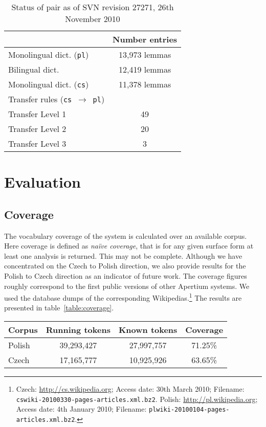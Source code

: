 \documentclass[11pt]{article}
\begin{document}
\begin{table}
\centering
\begin{tabular}{|l|c|}
\hline
                                           & Number entries\\
\hline
Monolingual dict. ({\tt pl})               & 13,973 lemmas \\
Bilingual dict.                            & 12,419 lemmas \\
Monolingual dict. ({\tt cs})               & 11,378 lemmas \\
\hline
Transfer rules ({\tt cs $\rightarrow$ pl}) &  \\
\hline
Transfer Level 1                                    & 49 \\
Transfer Level 2                                    & 20 \\
Transfer Level 3                                    & 3 \\
\hline
\end{tabular}
    \caption{Status of pair as of SVN revision 27271, 26th November 2010}
    \label{table:status}
\end{table}

\section{Evaluation}
\subsection{Coverage}

The vocabulary coverage of the system is calculated over an available corpus. Here coverage
is defined as \emph{na\"ive coverage}, that is for any given surface form at least one analysis
is returned. This may not be complete. Although we have concentrated on the Czech to Polish
direction, we also provide results for the Polish to Czech direction as an indicator of
future work. The coverage figures roughly correspond to the first public versions of
other Apertium systems.
We used the database dumps of the corresponding Wikipedias.\footnote{Czech: \url{http://cs.wikipedia.org}; Access date: 30th March 2010; Filename: 
{\small\tt cswiki-20100330-pages-articles.xml.bz2}. Polish: \url{http://pl.wikipedia.org}; Access date: 4th January 2010; Filename: 
{\small\tt plwiki-20100104-pages-articles.xml.bz2}.} The results are presented in table~\ref{table:coverage}.

\begin{table*}
\centering
\begin{tabular}{|l|c|c|c|}
\hline
Corpus & Running tokens & Known tokens & Coverage \\
\hline
Polish  & 39,293,427 & 27,997,757 & 71.25\%\\
Czech   & 17,165,777 & 10,925,926 & 63.65\%\\
\hline
\end{tabular}
    \caption{Naïve coverage for both translation directions}
    \label{table:coverage}
\end{table*}
\end{document}

